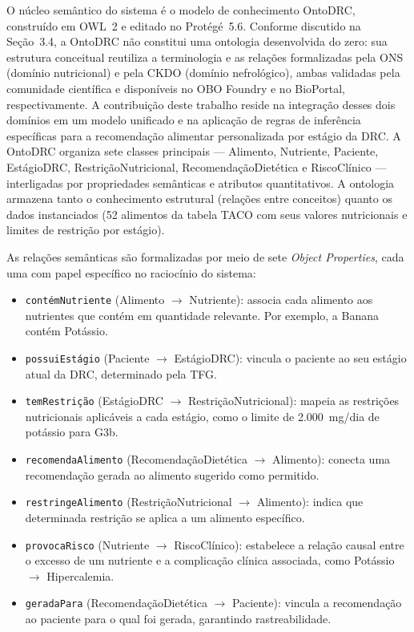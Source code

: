 \documentclass[12pt, a4paper, twocolumn]{article}
\begin{document}
O núcleo semântico do sistema é o modelo de conhecimento OntoDRC, construído em OWL~2 e editado no Protégé~5.6. Conforme discutido na Seção~3.4, a OntoDRC não constitui uma ontologia desenvolvida do zero: sua estrutura conceitual reutiliza a terminologia e as relações formalizadas pela ONS (domínio nutricional) e pela CKDO (domínio nefrológico), ambas validadas pela comunidade científica e disponíveis no OBO Foundry e no BioPortal, respectivamente. A contribuição deste trabalho reside na integração desses dois domínios em um modelo unificado e na aplicação de regras de inferência específicas para a recomendação alimentar personalizada por estágio da DRC. A OntoDRC organiza sete classes principais --- Alimento, Nutriente, Paciente, EstágioDRC, RestriçãoNutricional, RecomendaçãoDietética e RiscoClínico --- interligadas por propriedades semânticas e atributos quantitativos. A ontologia armazena tanto o conhecimento estrutural (relações entre conceitos) quanto os dados instanciados (52 alimentos da tabela TACO com seus valores nutricionais e limites de restrição por estágio).

As relações semânticas são formalizadas por meio de sete \textit{Object Properties}, cada uma com papel específico no raciocínio do sistema:

\begin{itemize}
    \item \texttt{contémNutriente} (Alimento $\rightarrow$ Nutriente): associa cada alimento aos nutrientes que contém em quantidade relevante. Por exemplo, a Banana contém Potássio.
    \item \texttt{possuiEstágio} (Paciente $\rightarrow$ EstágioDRC): vincula o paciente ao seu estágio atual da DRC, determinado pela TFG.
    \item \texttt{temRestrição} (EstágioDRC $\rightarrow$ RestriçãoNutricional): mapeia as restrições nutricionais aplicáveis a cada estágio, como o limite de 2.000~mg/dia de potássio para G3b.
    \item \texttt{recomendaAlimento} (RecomendaçãoDietética $\rightarrow$ Alimento): conecta uma recomendação gerada ao alimento sugerido como permitido.
    \item \texttt{restringeAlimento} (RestriçãoNutricional $\rightarrow$ Alimento): indica que determinada restrição se aplica a um alimento específico.
    \item \texttt{provocaRisco} (Nutriente $\rightarrow$ RiscoClínico): estabelece a relação causal entre o excesso de um nutriente e a complicação clínica associada, como Potássio $\rightarrow$ Hipercalemia.
    \item \texttt{geradaPara} (RecomendaçãoDietética $\rightarrow$ Paciente): vincula a recomendação ao paciente para o qual foi gerada, garantindo rastreabilidade.
\end{itemize}
\end{document}
